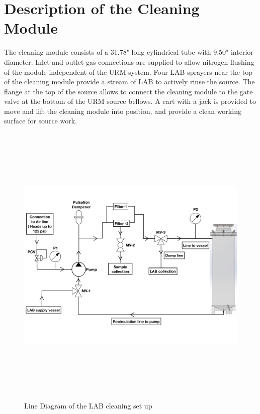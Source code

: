 \section{Description of the Cleaning Module}
The cleaning module consists of a  31.78" long cylindrical tube with 9.50" interior diameter. Inlet and outlet gas connections are supplied to allow nitrogen flushing of the module independent of the URM system. Four LAB sprayers near the top of the cleaning module provide a stream of LAB to actively rinse the source. The flange at the top of the source allows  to connect the cleaning module to the gate valve at the bottom of the URM source bellows. A cart with a jack is provided to move and lift the cleaning module into position, and provide a clean working surface for source work.
\begin{figure}[!htpb]
  \centering
  \includegraphics[width = 14cm, height=14cm ]{figures/LAB_3}
  \caption{Line Diagram of the LAB cleaning set up}
  \label{fig:SCV}
\end{figure}
\\
